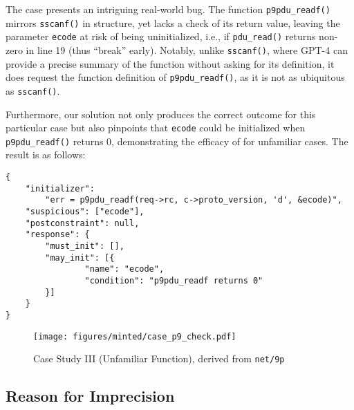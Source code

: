 The case presents an intriguing real-world bug. The function \texttt{p9pdu\_readf()} mirrors \texttt{sscanf()} in structure, yet lacks a check of its return value, leaving the parameter \texttt{ecode} at risk of being uninitialized, i.e., if \texttt{pdu\_read()} returns non-zero in line 19 (thus ``break'' early).
Notably, unlike \texttt{sscanf()}, where GPT-4 can provide a precise summary of the function without asking for its definition,
it does request the function definition of \texttt{p9pdu\_readf()}, as it is not as ubiquitous as \texttt{sscanf()}.  

Furthermore, our solution not only produces the correct outcome for this particular case but also pinpoints that \texttt{ecode} could be initialized when \texttt{p9pdu\_readf()} returns 0, demonstrating the efficacy of \work for unfamiliar cases. The result is as follows:


\begin{lstlisting}[numbers=none]
{
    "initializer": 
        "err = p9pdu_readf(req->rc, c->proto_version, 'd', &ecode)",
    "suspicious": ["ecode"],
    "postconstraint": null,
    "response": {
        "must_init": [],
        "may_init": [{
                "name": "ecode",
                "condition": "p9pdu_readf returns 0"
        }]
    }
}
\end{lstlisting}






\begin{figure}[]
\hspace{-15pt}
\texttt{[image: figures/minted/case\_p9\_check.pdf]}
    \caption{Case Study III (Unfamiliar Function), derived from \texttt{net/9p} 
    }
    \label{fig:p9_read}
\end{figure}


\vspace{-7pt}
\subsection{Reason for Imprecision}
\label{subsec:excuse}

